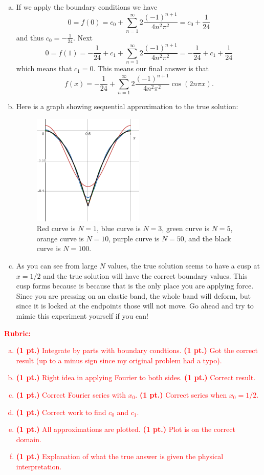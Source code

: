 \documentclass[12pt]{article} %
\begin{document}
\begin{solution}
\begin{enumerate}[(a)]
\item If we apply the boundary conditions we have
\[
0=f(0) = c_0 + \sum_{n=1}^\infty 2 \frac{(-1)^{n+1}}{4n^2 \pi^2}  = c_0 + \frac{1}{24}
\]
and thus $c_0=-\frac{1}{24}$. Next
\[
0=f(1) =-\frac{1}{24} + c_1 + \sum_{n=1}^\infty 2 \frac{(-1)^{n+1}}{4n^2 \pi^2}  = -\frac{1}{24} + c_1 + \frac{1}{24}
\]
which means that $c_1=0$. This means our final answer is that
\[
f(x) = -\frac{1}{24} +  \sum_{n=1}^\infty 2 \frac{(-1)^{n+1}}{4n^2 \pi^2} \cos(2n\pi x).
\]
\item Here is a graph showing sequential approximation to the true solution:
\begin{figure}[H]
\centering
\includegraphics[width=0.5\textwidth]{figures/fundamental_solution.png}
\caption{Red curve is $N=1$, blue curve is $N=3$, green curve is $N=5$, orange curve is $N=10$, purple curve is $N=50$, and the black curve is $N=100$.}
\end{figure}
\item As you can see from large $N$ values, the true solution seems to have a cusp at $x=1/2$ and the true solution will have the correct boundary values. This cusp forms because is because that is the only place you are applying force. Since you are pressing on an elastic band, the whole band will deform, but since it is locked at the endpoints those will not move. Go ahead and try to mimic this experiment yourself if you can!
\end{enumerate}
\end{solution}
\vspace*{1cm}
\textcolor{red}{
\noindent \textbf{Rubric:}
\begin{enumerate}[(a)]
    \item \textbf{(1 pt.)} Integrate by parts with boundary condtions. \textbf{(1 pt.)} Got the correct result (up to a minus sign since my original problem had a typo).
	\item \textbf{(1 pt.)} Right idea in applying Fourier to both sides. \textbf{(1 pt.)} Correct result.
	\item \textbf{(1 pt.)} Correct Fourier series with $x_0$. \textbf{(1 pt.)} Correct series when $x_0=1/2$. 
	\item \textbf{(1 pt.)} Correct work to find $c_0$ and $c_1$.
	\item \textbf{(1 pt.)} All approximations are plotted. \textbf{(1 pt.)} Plot is on the correct domain.
	\item \textbf{(1 pt.)} Explanation of what the true answer is given the physical interpretation.
\end{enumerate}
}
\end{document}
